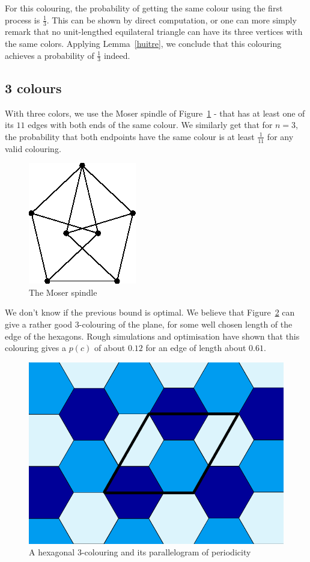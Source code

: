 \documentclass[a4paper,11pt]{article}
\theoremstyle{definition}
\theoremstyle{remark}
\begin{document}
For this colouring, the probability of getting the same colour using the first 
process is $\frac13$. This can be shown by direct computation, or one can 
more simply remark that no unit-lengthed equilateral triangle can have its 
three vertices with the same colors. Applying Lemma~\ref{huitre}, we conclude 
that this colouring achieves a probability of $\frac{1}{3}$ indeed.

\subsection{3 colours}
 With three colors, we use the Moser spindle of Figure~\ref{color} - that 
 has at least one of its $11$ edges with both ends of the same colour.
 We similarly get that for $n=3$, the probability that both endpoints have the 
 same colour is at least 
 $\frac{1}{11}$ for any valid colouring. 

\begin{figure}[h]
\center
\includegraphics[scale=0.4]{T.png}
\caption{\label{color} The Moser spindle}
\end{figure}

We don't know if the previous bound is optimal. We believe that Figure~\ref{trois} 
can give a rather good $3$-colouring of the plane, for some well chosen length 
of the edge of the hexagons. Rough simulations and optimisation have shown that 
this colouring gives a $p(c)$ of about $0.12$ for an edge of length about $0.61$. 

\begin{figure}[h]
\center
\includegraphics[scale=0.5]{trois.png}
\caption{\label{trois} A hexagonal $3$-colouring and its parallelogram of periodicity}
\end{figure}
\end{document}
